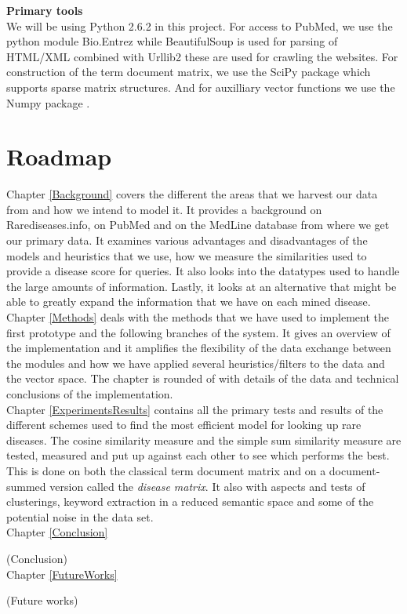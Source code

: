 \textbf{Primary tools} \\ 
We will be using Python 2.6.2 \cite{PythonLanguage} in this project. For access to PubMed, we use
the python module Bio.Entrez \cite{EntrezProgUtil} while BeautifulSoup
\cite{BS} is used for parsing of HTML/XML combined with Urllib2
\cite{UL2} these are used for crawling the websites. For construction
of the term document matrix, we use the SciPy package \cite{SciPy}
which supports sparse matrix structures. And for auxilliary vector
functions we use the Numpy package \cite{NumPy}.

\section{Roadmap}

Chapter \ref{Background} covers the different the areas that we harvest our
data from and how we intend to model it. It provides a background on
Rarediseases.info, on PubMed and on the MedLine database from where we
get our primary data. It examines various advantages and
disadvantages of the models and heuristics that we use, how we measure
the similarities used to provide a disease score for queries. It also
looks into the datatypes used to handle the large amounts of
information. Lastly, it looks at an alternative that might be able to
greatly expand the information that we have on each mined disease.\\

Chapter \ref{Methods} deals with the methods that we have used to implement
the first prototype and the following branches of the system. It gives
an overview of the implementation and it amplifies the flexibility of the data
exchange between the modules and how we have applied several
heuristics/filters to the data and the vector space. The chapter is
rounded of with details of the data and technical conclusions of the
implementation.\\

Chapter \ref{ExperimentsResults} contains all the primary tests and
results of the different schemes used to find the most efficient model
for looking up rare diseases. The cosine similarity measure and the
simple sum similarity measure are tested, measured and put up against
each other to see which performs the best. This is done on
both the classical term document matrix and on a document-summed
version called the \textit{disease matrix}. It also with aspects and
tests of clusterings, keyword extraction in a reduced semantic space
and some of the potential noise in the data set.\\

Chapter \ref{Conclusion}

(Conclusion)\\

Chapter \ref{FutureWorks}

(Future works) \\

